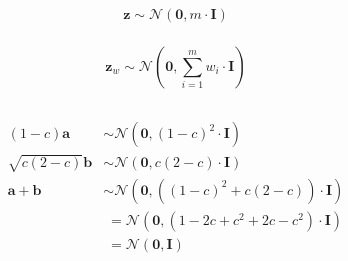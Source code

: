 \documentclass[a4paper]{article}
\newcommand*{\bs}[1]{\boldsymbol{#1}}
\begin{document}
\subsubsection{}
\label{subsubsec:221}
\[
\bs{z} \sim \mathcal{N}(\bs{0}, m\cdot \bs{I})
\]
\subsubsection{}
\label{subsubsec:222}
\[
\bs{z}_w \sim \mathcal{N}(\bs{0}, \sum_{i=1}^{m}w_i\cdot \bs{I})
\]
\subsubsection{}
\label{subsubsec:223}

\subsection{}
\label{subsec:23}
\begin{align*}
  (1-c)\bs{a} &\sim \mathcal{N}(\bs{0}, (1-c)^2\cdot \bs{I})\\
  \sqrt{c(2-c)}\bs{b} &\sim \mathcal{N}(\bs{0}, c(2-c)\cdot \bs{I})\\
  \bs{a} + \bs{b} &\sim \mathcal{N}(\bs{0}, ((1-c)^2 + c(2-c))\cdot \bs{I})\\
  &\;=\mathcal{N}(\bs{0}, (1-2c +c^2 + 2c-c^2) \cdot \bs{I})\\
  &\;=\mathcal{N}(\bs{0}, \bs{I})
\end{align*}
\end{document}
